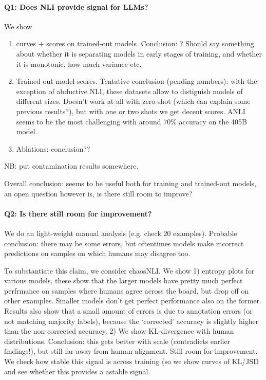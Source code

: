 \paragraph{Q1: Does NLI provide signal for LLMs?}
We show \begin{enumerate}
    \item curves + scores on trained-out models.  Conclusion: ? Should say something about whether it is separating models in early stages of training, and whether it is monotonic, how much variance etc.
    \item Trained out model scores. Tentative conclusion (pending numbers): with the exception of abductive NLI, these datasets allow to distiguish models of different sizes. Doesn't work at all with zero-shot (which can explain some previous results?), but with one or two shots we get decent scores. ANLI seems to be the most challenging with around 70\% accuracy on the 405B model.
    \item Ablations: conclusion??
\end{enumerate}

NB: put contamination results somewhere.

Overall conclusion: seems to be useful both for training and trained-out models, an open question however is, is there still room to improve?

\paragraph{Q2: Is there still room for improvement?}
We do an light-weight manual analysis (e.g. check 20 examples).
Probable conclusion: there may be some errors, but oftentimes models make incorrect predictions on samples on which humans may disagree too.

To substantiate this claim, we consider chaosNLI.
We show 1) entropy plots for various models, these show that the larger models have pretty much perfect perfrmance on samples where humans agree across the board, but drop off on other examples. Smaller models don't get perfect performance also on the former. Results also show that a small amount of errors is due to annotation errors (or not matching majority labels), because the `corrected' accuracy is slightly higher than the non-corrected accuracy.
2) We show KL-divergence with human distributions. Conclusion: this gets better with scale (contradicts earlier findings!), but still far away from human alignment. Still room for improvement. We check how stable this signal is across training (so we show curves of KL/JSD and see whether this provides a astable signal.


